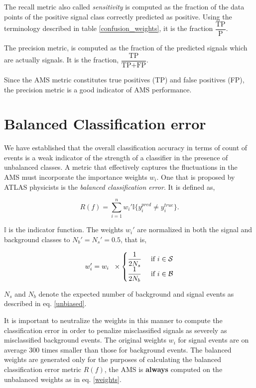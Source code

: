 The recall metric also called \textit{sensitivity} is computed as the fraction of the data points of the positive signal class correctly predicted as positive. Using the terminology described in table \ref{confusion_weights}, it is the fraction $\dfrac{\text{TP}}{\text{P}}$.  

The precision metric, is computed as the fraction of the predicted signals which are actually signals. It is the fraction, $\dfrac{\text{TP}}{\text{TP}+\text{FP}}$.

Since the AMS metric constitutes true positives (TP) and false positives (FP), the precision metric is a good indicator of AMS performance. 

\section{Balanced Classification error}

We have established that the overall classification accuracy in terms of count of events is a weak indicator of the strength of a classifier in the presence of unbalanced classes. A metric that effectively captures the fluctuations in the AMS must incorporate the importance weights $w_{i}$. One that is proposed by ATLAS physicists is the \textit{balanced classification error}. It is defined as, 

\begin{equation} 
R(f) = \sum_{i=1}^{n}w_{i}'\mathbb{I}\{y_{i}^{pred} \neq y_{i}^{true}\}. 
\label{bce}
\end{equation}

$\mathbb{I}$ is the indicator function. The weights $w_{i}'$ are normalized in both the signal and background classes to $N_{b}' = N_{s}' = 0.5$, that is, 

\begin{equation}
w_{i}' = w_{i}  \hspace{2mm} \times 
\begin{cases}
\dfrac{1}{2N_{s}} & \textrm{ if } i \in \mathcal{S} \\
\dfrac{1}{2N_{b}} & \textrm{ if } i \in \mathcal{B} 
\end{cases}
\label{neutralize}
\end{equation}

$N_s$ and $N_{b}$ denote the expected number of background and signal events as described in eq. \ref{unbiased}. 

It is important to neutralize the weights in this manner to compute the classification error in order to penalize misclassified signals as severely as misclassified background events. The original weights $w_{i}$ for signal events are on average 300 times smaller than those for background events. The balanced weights are generated only for the purposes of calculating the balanced classification error metric $R(f)$, the AMS is \textbf{always} computed on the unbalanced weights as in eq. \ref{weights}.

